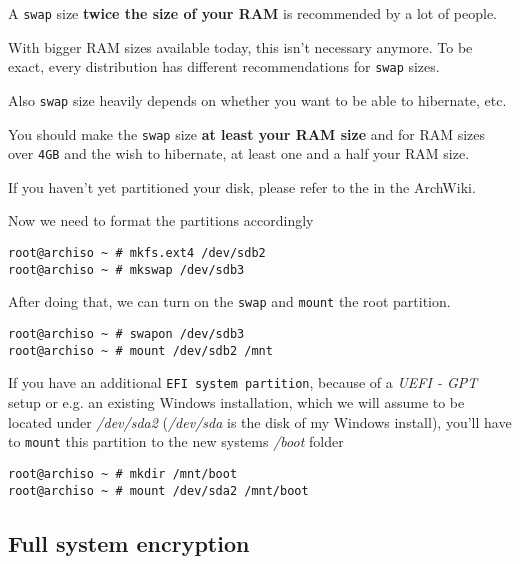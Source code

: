 \documentclass[10pt]{dustdoc}
\begin{document}
\begin{NOTE}
    A \texttt{swap} size \textbf{twice the size of your RAM} is recommended by a lot of people.

    With bigger RAM sizes available today, this isn’t necessary anymore.
    To be exact, every distribution has different recommendations for \texttt{swap} sizes.

    Also \texttt{swap} size heavily depends on whether you want to be able to hibernate, etc.

    You should make the \texttt{swap} size \textbf{at least your RAM size} and for RAM sizes over \texttt{4GB} and the wish to hibernate, at least one and a half your RAM size.
\end{NOTE}

\begin{IMPORTANT}
    If you haven’t yet partitioned your disk, please refer to the  in the ArchWiki.
\end{IMPORTANT}

Now we need to format the partitions accordingly

\begin{verbatim}
root@archiso ~ # mkfs.ext4 /dev/sdb2
root@archiso ~ # mkswap /dev/sdb3
\end{verbatim}

After doing that, we can turn on the \texttt{swap} and \texttt{mount} the root partition.

\begin{verbatim}
root@archiso ~ # swapon /dev/sdb3
root@archiso ~ # mount /dev/sdb2 /mnt
\end{verbatim}

\begin{NOTE}
    If you have an additional \texttt{EFI system partition}, because of a \emph{UEFI - GPT} setup or e.g. an existing Windows installation, which we will assume to be located under \textit{/dev/sda2} (\textit{/dev/sda} is the disk of my Windows install), you’ll have to \texttt{mount} this partition to the new systems \textit{/boot} folder

    \begin{verbatim}
root@archiso ~ # mkdir /mnt/boot
root@archiso ~ # mount /dev/sda2 /mnt/boot
    \end{verbatim}
\end{NOTE}

\subsection{Full system encryption}
\label{sec:full-system-encryption}
\end{document}
